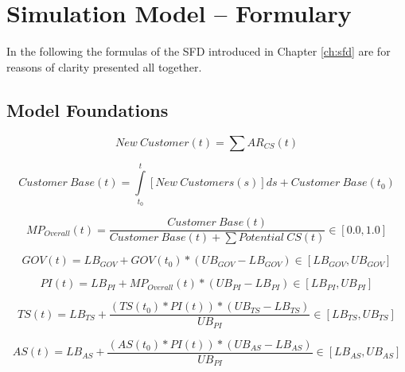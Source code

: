 \chapter{Simulation Model -- Formulary}\label{ch:app04}

In the following the formulas of the \ac{SFD} introduced in Chapter \ref{ch:sfd} are for reasons of clarity presented all together.

\section{Model Foundations}\label{ch:app04:mf}

\begin{equation}
	\mathit{New~Customer(t)} = \sum AR_{CS}(t)
\end{equation}

\begin{equation}
	\mathit{Customer~Base(t)} = \int\limits_{t_0}^t \mathit{[New~Customers(s)]ds} + \mathit{Customer~Base(t_0)}
\end{equation}

\begin{equation}
	MP_{Overall}(t) = \frac{\mathit{Customer~Base(t)}}{\mathit{Customer~Base(t)} + \sum \mathit{Potential~CS(t)}} \in [0.0,1.0]
\end{equation}

\begin{equation}
	GOV(t) = LB_{GOV} + GOV(t_0) * (UB_{GOV} - LB_{GOV}) \in [LB_{GOV},UB_{GOV}]
\end{equation}

\begin{equation}
	PI(t) = LB_{PI} + MP_{Overall}(t) * (UB_{PI} - LB_{PI}) \in [LB_{PI},UB_{PI}]
\end{equation}

\begin{equation}
	TS(t) = LB_{TS} +  \frac{(TS(t_0) * PI(t)) * (UB_{TS} - LB_{TS})}{UB_{PI}} \in [LB_{TS},UB_{TS}]
\end{equation}

\begin{equation}
	AS(t) = LB_{AS} +  \frac{(AS(t_0) * PI(t)) * (UB_{AS} - LB_{AS})}{UB_{PI}} \in [LB_{AS},UB_{AS}]
\end{equation}

